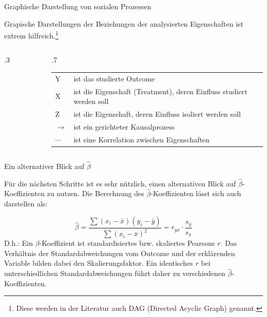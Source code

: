\documentclass[18pt, aspectratio=169]{beamer}
\begin{document}
\begin{frame}{Graphische Darstellung von sozialen Prozessen}

Grapische Darstellungen der Beziehungen der analysierten Eigenschaften ist extrem hilfreich.\footnote{Diese werden in der Literatur auch DAG (Directed Acyclic Graph) genannt.} 

\begin{columns}

\begin{column}{.3\linewidth}
\begin{figure}
\begin{center}
\end{center}
\end{figure}
\end{column}

\begin{column}{.7\linewidth}

\begin{tabular}{ll}
Y & ist das studierte Outcome\\
X & ist die Eigenschaft (Treatment), deren Einfluss studiert werden soll\\
Z & ist die Eigenschaft, deren Einfluss isoliert werden soll\\ 
$\rightarrow$ & ist ein gerichteter Kausalprozess\\
$\cdots $ & ist eine Korrelation zwischen Eigenschaften\\ 
\end{tabular}

\end{column}

\end{columns}
\end{frame}


\begin{frame}{Ein alternativer Blick auf $\hat{\beta}$}

Für die nächsten Schritte ist es sehr nützlich, einen alternativen Blick auf $\hat{\beta}$-Koeffizienten zu nutzen. Die Berechnung des $\hat{\beta}$-Koeffizienten lässt sich auch darstellen als: 

\begin{equation}
\hat{\beta} = \frac{\sum(x_i-\bar{x})(y_i - \bar{y})}{\sum(x_i-\bar{x})^2} = r_{yx} \cdot \frac{s_y}{s_{x}}
\end{equation}
\vfill
D.h.: Ein $\beta$-Koeffizient ist standardisiertes bzw. skaliertes Pearsons $r$. Das Verhältnis der Standardabweichungen vom Outcome und der erklärenden Variable bilden dabei den Skalierungsfaktor. Ein identisches $r$ bei unterschiedlichen Standardabweichungen führt daher zu verschiedenen $\hat{\beta}$-Koeffizienten.

\end{frame}
\end{document}
